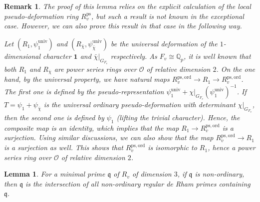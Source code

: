 \documentclass[a4paper, 12pt]{amsart}
\newtheorem{lem}[thm]{Lemma}
\newtheorem{rem}[thm]{\bf Remark}
\def\ps{\mathrm{ps}}
\def\ord{\mathrm{ord}}
\newcommand{\Q}{\mathbb{Q}}
\newcommand{\cO}{\mathcal{O}}
\newcommand{\kq}{\mathfrak{q}}
\begin{document}
    \begin{rem}
    	The proof of this lemma relies on the explicit calculation of the local pseudo-deformation ring $R_v^{\ps}$, but such a result is not known in the exceptional case. However, we can also prove this result in that case in the following way.
    	
    	Let $(R_1, \psi_1^{\operatorname{univ}})$ and $(R_{\bar{\chi}}, \psi_{\bar{\chi}}^{\operatorname{univ}})$ be the universal deformation of the $1$-dimensional character $\mathbf{1}$ and $\bar{\chi}|_{G_{F_v}}$ respectively. As $F_v \cong \Q_p$, it is well known that both $R_1$ and $ R_{\bar{\chi}}$ are power series rings over $\cO$ of relative dimension $2$. On the one hand, by the universal property, we have natural maps $ R_v^{\ps, \ord} \to R_1 \to R_v^{\ps, \ord}$. The first one is defined by the pseudo-representation $ \psi_1^{\operatorname{univ}}+\chi|_{G_{F_v}}( \psi_1^{\operatorname{univ}})^{-1}$. If $T=\psi_1+\psi_{\bar{\chi}}$ is the universal ordinary pseudo-deformation with determinant $\chi|_{G_{F_v}}$, then the second one is defined by $\psi_1$ (lifting the trivial character). Hence, the composite map is an identity, which implies that the map $R_1 \to R_v^{\ps, \ord} $ is a surjection. Using similar discussions, we can also show that the map $R_v^{\ps, \ord} \to R_1 $ is a surjection as well. This shows that $R_v^{\ps, \ord} $ is isomorphic to $ R_1$, hence a power series ring over $\cO$ of relative dimension $2$.
    	
        \end{rem}
    
        \begin{lem}\label{lem of Rv}
        	For a minimal prime $\kq$ of $R_v$ of dimension $3$, if $\kq$ is non-ordinary, then $\kq$ is the intersection of all non-ordinary regular de Rham primes containing $\kq$.
        \end{lem}
    
\end{document}
